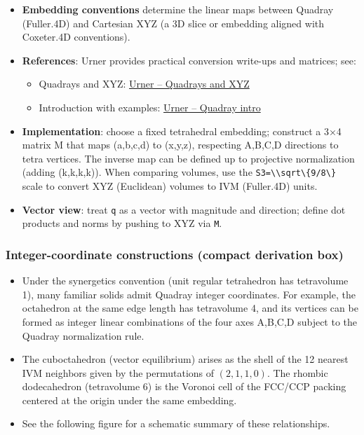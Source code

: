 \documentclass[
  10pt,
]{article}
\newcommand{\passthrough}[1]{#1}
\providecommand{\tightlist}{%
  \setlength{\itemsep}{0pt}\setlength{\parskip}{0pt}}
\begin{document}
\begin{itemize}
\tightlist
\item
  \textbf{Embedding conventions} determine the linear maps between
  Quadray (Fuller.4D) and Cartesian XYZ (a 3D slice or embedding aligned
  with Coxeter.4D conventions).
\item
  \textbf{References}: Urner provides practical conversion write-ups and
  matrices; see:

  \begin{itemize}
  \tightlist
  \item
    Quadrays and XYZ:
    \href{https://www.grunch.net/synergetics/quadxyz.html}{Urner --
    Quadrays and XYZ}
  \item
    Introduction with examples:
    \href{https://www.grunch.net/synergetics/quadintro.html}{Urner --
    Quadray intro}
  \end{itemize}
\item
  \textbf{Implementation}: choose a fixed tetrahedral embedding;
  construct a 3×4 matrix M that maps (a,b,c,d) to (x,y,z), respecting
  A,B,C,D directions to tetra vertices. The inverse map can be defined
  up to projective normalization (adding (k,k,k,k)). When comparing
  volumes, use the \passthrough{\lstinline!S3=\\sqrt\{9/8\}!} scale to
  convert XYZ (Euclidean) volumes to IVM (Fuller.4D) units.
\item
  \textbf{Vector view}: treat \passthrough{\lstinline!q!} as a vector
  with magnitude and direction; define dot products and norms by pushing
  to XYZ via \passthrough{\lstinline!M!}.
\end{itemize}

\subsubsection{Integer-coordinate constructions (compact derivation
box)}\label{integer-coordinate-constructions-compact-derivation-box}

\begin{itemize}
\tightlist
\item
  Under the synergetics convention (unit regular tetrahedron has
  tetravolume 1), many familiar solids admit Quadray integer
  coordinates. For example, the octahedron at the same edge length has
  tetravolume 4, and its vertices can be formed as integer linear
  combinations of the four axes A,B,C,D subject to the Quadray
  normalization rule.
\item
  The cuboctahedron (vector equilibrium) arises as the shell of the 12
  nearest IVM neighbors given by the permutations of \((2,1,1,0)\). The
  rhombic dodecahedron (tetravolume 6) is the Voronoi cell of the
  FCC/CCP packing centered at the origin under the same embedding.
\item
  See the following figure for a schematic summary of these
  relationships.
\end{itemize}
\end{document}
